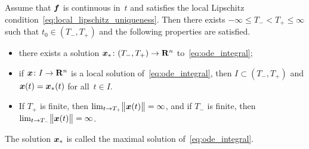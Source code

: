 \begin{corollary}
    \label{corollary:maximal_solutions}
    Assume that $\vect f$ is continuous in~$t$ and satisfies the local Lipschitz condition~\eqref{eq:local_lipschitz_uniqueness}.
    Then there exists $- \infty \leq T_- < T_+ \leq \infty$ such that $t_0 \in (T_-, T_+)$ and
    the following properties are satisfied.
    \begin{itemize}
        \item
            there exists a solution $\vect x_* \colon (T_-, T_+) \to \real^n$ to~\eqref{eq:ode_integral};

        \item
            if $\vect x\colon I \to \real^n$ is a local solution of~\eqref{eq:ode_integral},
            then $I \subset (T_-, T_+)$ and $\vect x(t) = \vect x_*(t)$ for all~$t \in I$.

        \item
            If $T_+$ is finite, then $\lim_{t \to T_+} \vecnorm[\big]{\vect x(t)} = \infty$,
            and if $T_-$ is finite,
            then $\lim_{t \to T_-} \vecnorm[\big]{\vect x(t)} = \infty$.
    \end{itemize}
    The solution $\vect x_*$ is called the maximal solution of~\eqref{eq:ode_integral}.
\end{corollary}
